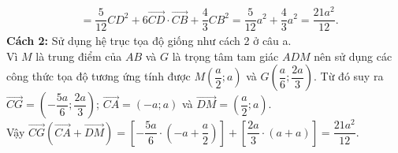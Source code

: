 \begin{vd}
{\begin{enumerate}
\begin{align*}
				&=\dfrac{5}{12}CD^2+6\overrightarrow{CD}\cdot \overrightarrow{CB}+ \dfrac{4}{3}CB^2=\dfrac{5}{12}a^2+\dfrac{4}{3}a^2=\dfrac{21a^2}{12}.
			\end{align*}
			\textbf{Cách 2:} Sử dụng hệ trục tọa độ giống như cách 2 ở câu a.\\
			Vì $ M $ là trung điểm của $ AB $ và $ G $ là trọng tâm tam giác $ ADM $ nên sử dụng các công thức tọa độ tương ứng tính được $ M\left (\dfrac{a}{2};a\right ) $ và $ G\left ( \dfrac{a}{6}; \dfrac{2a}{3} \right ) $. Từ đó suy ra $ \overrightarrow{CG}=\left(-\dfrac{5a}{6}; \dfrac{2a}{3} \right)  $; $ \overrightarrow{CA}=(-a;a) $ và $ \overrightarrow{DM}=\left (\dfrac{a}{2};a\right ) $.\\
			Vậy $ \overrightarrow{CG}\left (\overrightarrow{CA}+\overrightarrow{DM}\right )=\left [-\dfrac{5a}{6}\cdot \left (-a+\dfrac{a}{2}\right ) \right ]+\left [\dfrac{2a}{3}\cdot (a+a)\right ]=\dfrac{21a^2}{12} $.
		\end{enumerate}
	}
\end{vd}



